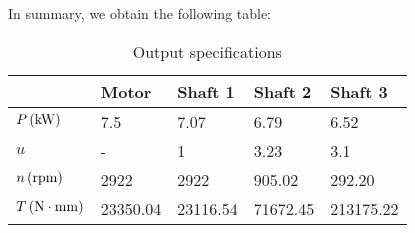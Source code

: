 In summary, we obtain the following table:
\begin{table}[ht]
	\centering
	\begin{tabular}{lllll}
		&Motor    & Shaft 1  & Shaft 2  & Shaft 3   \\\toprule
		$ P \, (\mathrm{kW})$ & 7.5  & 7.07& 6.79   & 6.52   \\
		$ u $ &       -   &1    &  3.23  & 3.1                 \\
		$ n \, (\mathrm{rpm})$ & 2922 & 2922 & 905.02 & 292.20 \\
		$ T \, (\mathrm{N\cdot mm})$ & 23350.04 & 23116.54 & 71672.45 & 213175.22
	\end{tabular}
	\caption{Output specifications}
	\label{tab:my-table}
\end{table}


